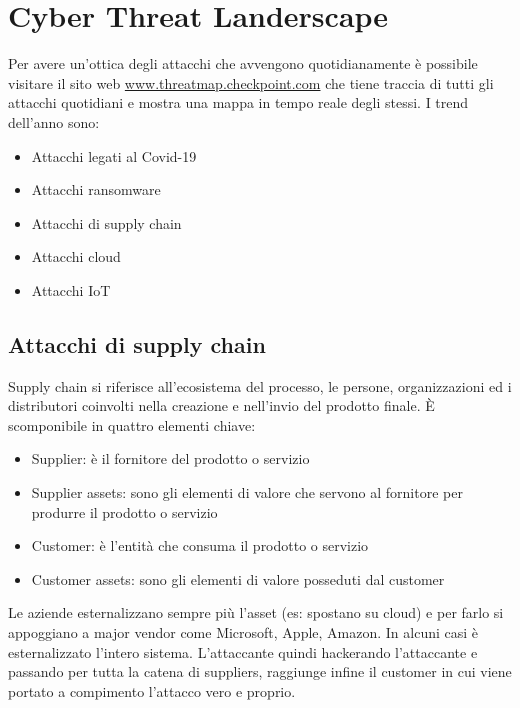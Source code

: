 \section{Cyber Threat Landerscape}
\label{sec:cyberthreatlanderscape}
Per avere un'ottica degli attacchi che avvengono quotidianamente è possibile visitare il sito web \url{www.threatmap.checkpoint.com} che tiene traccia di tutti gli attacchi quotidiani e mostra una mappa in tempo reale degli stessi.
I trend dell'anno sono:
\begin{itemize}[noitemsep]
    \item Attacchi legati al Covid-19
    \item Attacchi ransomware
    \item Attacchi di supply chain
    \item Attacchi cloud
    \item Attacchi IoT
\end{itemize}

\subsection{Attacchi di supply chain}
Supply chain si riferisce all'ecosistema del processo, le persone, organizzazioni ed i distributori coinvolti nella creazione e nell'invio del prodotto finale\cite{ENISA_SupplyChainAttacks}.
È scomponibile in quattro elementi chiave:
\begin{itemize}[noitemsep]
    \item Supplier: è il fornitore del prodotto o servizio
    \item Supplier assets: sono gli elementi di valore che servono al fornitore per produrre il prodotto o servizio
    \item Customer: è l'entità che consuma il prodotto o servizio
    \item Customer assets: sono gli elementi di valore posseduti dal customer
\end{itemize}
Le aziende esternalizzano sempre più l'asset (es: spostano su cloud) e per farlo si appoggiano a major vendor come Microsoft, Apple, Amazon.
In alcuni casi è esternalizzato l'intero sistema.
L'attaccante quindi hackerando l'attaccante e passando per tutta la catena di suppliers, raggiunge infine il customer in cui viene portato a compimento l'attacco vero e proprio.

